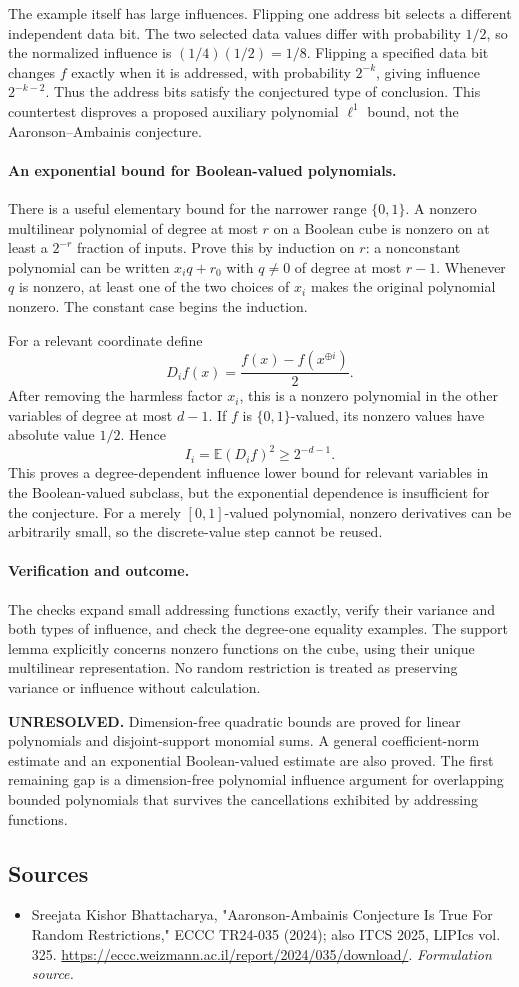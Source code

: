 \documentclass[11pt]{article}
\begin{document}
The example itself has large influences. Flipping one address bit selects a different independent data bit. The two selected data values differ with probability $1/2$, so the normalized influence is $(1/4)(1/2)=1/8$. Flipping a specified data bit changes $f$ exactly when it is addressed, with probability $2^{-k}$, giving influence $2^{-k-2}$. Thus the address bits satisfy the conjectured type of conclusion. This countertest disproves a proposed auxiliary polynomial $\ell^1$ bound, not the Aaronson--Ambainis conjecture.

\paragraph{An exponential bound for Boolean-valued polynomials.}
There is a useful elementary bound for the narrower range $\{0,1\}$. A nonzero multilinear polynomial of degree at most $r$ on a Boolean cube is nonzero on at least a $2^{-r}$ fraction of inputs. Prove this by induction on $r$: a nonconstant polynomial can be written $x_iq+r_0$ with $q\ne0$ of degree at most $r-1$. Whenever $q$ is nonzero, at least one of the two choices of $x_i$ makes the original polynomial nonzero. The constant case begins the induction.

For a relevant coordinate define
\[
 D_if(x)=\frac{f(x)-f(x^{\oplus i})}{2}.
\]
After removing the harmless factor $x_i$, this is a nonzero polynomial in the other variables of degree at most $d-1$. If $f$ is $\{0,1\}$-valued, its nonzero values have absolute value $1/2$. Hence
\[
 I_i=\mathbb E(D_if)^2\ge 2^{-d-1}.
\]
This proves a degree-dependent influence lower bound for relevant variables in the Boolean-valued subclass, but the exponential dependence is insufficient for the conjecture. For a merely $[0,1]$-valued polynomial, nonzero derivatives can be arbitrarily small, so the discrete-value step cannot be reused.

\paragraph{Verification and outcome.}
The checks expand small addressing functions exactly, verify their variance and both types of influence, and check the degree-one equality examples. The support lemma explicitly concerns nonzero functions on the cube, using their unique multilinear representation. No random restriction is treated as preserving variance or influence without calculation.

\textbf{UNRESOLVED.} Dimension-free quadratic bounds are proved for linear polynomials and disjoint-support monomial sums. A general coefficient-norm estimate and an exponential Boolean-valued estimate are also proved. The first remaining gap is a dimension-free polynomial influence argument for overlapping bounded polynomials that survives the cancellations exhibited by addressing functions.

\subsection{Sources}
\begin{itemize}
\item[S1]Sreejata Kishor Bhattacharya, "Aaronson-Ambainis Conjecture Is True For Random Restrictions," ECCC TR24-035 (2024); also ITCS 2025, LIPIcs vol. 325.
\url{https://eccc.weizmann.ac.il/report/2024/035/download/}.
\textit{Formulation source.}
\end{itemize}
\end{document}

